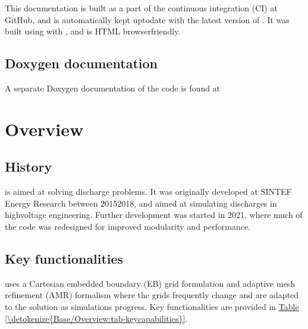 \documentclass[letterpaper,10pt,english]{sphinxmanual}
\begin{document}
\sphinxAtStartPar
This documentation is built as a part of the continuous integration (CI) at GitHub, and is automatically kept up\sphinxhyphen{}to\sphinxhyphen{}date with the latest version of .
It was built using  with , and is HTML browser\sphinxhyphen{}friendly.


\subsection{Doxygen documentation}
\label{\detokenize{Base/Documentation:doxygen-documentation}}
\sphinxAtStartPar
A separate Doxygen documentation of the  code is found at 

\sphinxstepscope


\section{Overview}
\label{\detokenize{Base/Overview:overview}}\label{\detokenize{Base/Overview:chap-overview}}\label{\detokenize{Base/Overview::doc}}

\subsection{History}
\label{\detokenize{Base/Overview:history}}
\sphinxAtStartPar
{} is aimed at solving discharge problems.
It was originally developed at SINTEF Energy Research between 2015\sphinxhyphen{}2018, and aimed at simulating discharges in high\sphinxhyphen{}voltage engineering.
Further development was started in 2021, where much of the code was redesigned for improved modularity and performance.


\subsection{Key functionalities}
\label{\detokenize{Base/Overview:key-functionalities}}
\sphinxAtStartPar
{} uses a Cartesian embedded boundary (EB) grid formulation and adaptive mesh refinement (AMR) formalism where the grids frequently change and are adapted to the solution as simulations progress.
Key functionalities are provided in \hyperref[\detokenize{Base/Overview:tab-keycapabilities}]{Table \ref{\detokenize{Base/Overview:tab-keycapabilities}}}.
\end{document}
